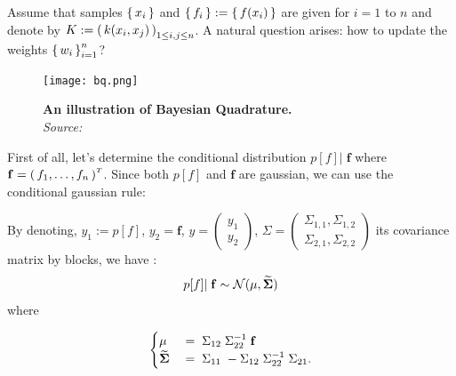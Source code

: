 Assume that samples $\left \{ \, x_i \, \right \}$ and $\left \{ \, f_i \, \right \} := \left \{ \, f(x_i) \, \right \}$ are given for $i=1$ to $n$ and denote by $K:= \left( \, k(x_i, x_j) \, \right)_{1 \leq i,j \leq n}$. A natural question arises: how to update the weights $\left \{ \, w_i \, \right \}_{i=1}^n $?

\begin{figure}[H]
\centering
\texttt{[image: bq.png]}
\caption{\textbf{An illustration of Bayesian Quadrature.}\\\textit{Source:} \cite{huszar}}
\label{fig:bq}
\end{figure}

First of all, let's determine the conditional distribution $\displaystyle
 p[f]| \; \mathbf{f}$ where
$\mathbf{f} = \left( \, f_1, \ldots, f_n \, \right)^{\scriptscriptstyle T}$.
Since both $p[f]$ and $\mathbf{f}$ are gaussian, we can use the conditional gaussian rule:
\begin{boxdefinition}
  By denoting, $y_1 := p[f]$, $y_2 = \mathbf{f}$, $y = \begin{pmatrix}
    y_1\\y_2
\end{pmatrix}$, $\displaystyle \Sigma = \begin{pmatrix}
  \Sigma_{1,1}, \Sigma_{1,2}\\
  \Sigma_{2,1}, \Sigma_{2,2}
\end{pmatrix}$ its covariance matrix by blocks, we have :
$$p[f]| \; \mathbf{f} \sim \mathcal { N } (  \mu  , \mathbf{\widetilde{\Sigma}} )$$
where


  \begin{equation*}
  \begin{cases}
    \mu \;&= \;  \Sigma _ { 12 } \; \Sigma _ { 22 } ^ { - 1 } \; \mathbf{f} \\
     \mathbf{\widetilde{\Sigma}} \; &= \;  \Sigma _ { 11 } \;- \Sigma _ { 12 } \;\Sigma _ { 22 } ^ { - 1 } \; \Sigma _ { 21 }.
  \end{cases}
\end{equation*}
\end{boxdefinition}

